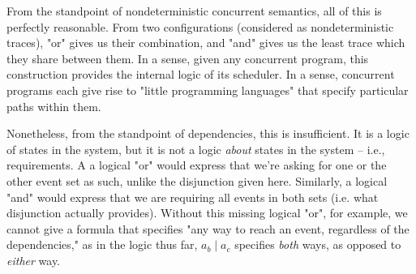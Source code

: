 \documentclass[hoptionsi,review,format=acmsmall]{acmart}
\theoremstyle{definition}
\newcommand{\bor}{\mathbin{|}}
\begin{document}


From the standpoint of nondeterministic concurrent semantics, all of this is perfectly reasonable. From two configurations (considered as nondeterministic traces), "or" gives us their combination, and "and" gives us the least trace which they share between them. In a sense, given any concurrent program, this construction provides the internal logic of its scheduler. In a sense, concurrent programs each give rise to "little programming languages" that specify particular paths within them.

Nonetheless, from the standpoint of dependencies, this is insufficient. It is a logic of states in the system, but it is not a logic \textit{about} states in the system -- i.e., requirements. A a logical "or"  would express that we're asking for one or the other event set as such, unlike the disjunction given here. Similarly, a logical "and" would express that we are requiring all events in both sets (i.e. what disjunction actually provides). Without this missing logical "or", for example, we cannot give a formula that specifies "any way to reach an event, regardless of the dependencies," as in the logic thus far, \(a_b \bor a_c\) specifies \textit{both} ways, as opposed to \textit{either} way.
\end{document}
